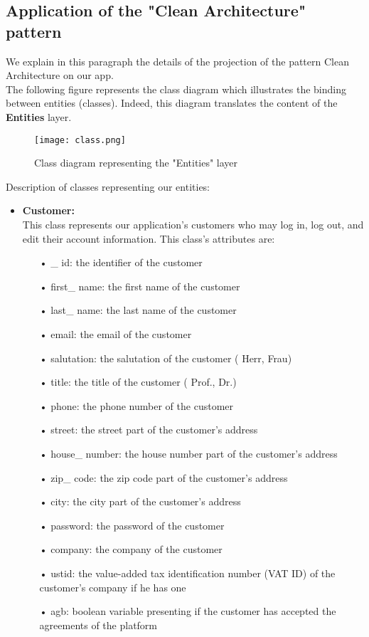 \subsection{Application of the "Clean Architecture" pattern}
We explain in this paragraph the details of the projection of the pattern
Clean Architecture on our app.\\
The following figure represents the class diagram which illustrates the binding
between entities (classes). Indeed, this diagram translates the content of the \textbf{Entities} layer.
\begin{figure}[H]%
    \center   
    \texttt{[image: class.png]}
    \caption{Class diagram representing the "Entities" layer}
\end{figure}
\newpage
Description of classes representing our entities:
\begin{itemize}
\item \textbf{Customer:}\\
This class represents our application's customers who may log in, log out, and edit their account information. This class's attributes are:
\begin{itemize}
\item[•] \_ id: the identifier of the customer
\item[•] first\_ name: the first name of the customer
\item[•] last\_ name: the last name of the customer
\item[•] email: the email of the customer
\item[•] salutation: the salutation of the customer ( Herr, Frau)
\item[•] title: the title of the customer ( Prof., Dr.)
\item[•] phone: the phone number of the customer
\item[•] street: the street part of the customer's address
\item[•] house\_ number: the house number part of the customer's address
\item[•] zip\_ code: the zip code part of the customer's address
\item[•] city: the city part of the customer's address
\item[•] password: the password of the customer
\item[•] company: the company of the customer
\item[•] ustid: the value-added tax identification number (VAT ID) of the customer's company if he has one
\item[•] agb: boolean variable presenting if the customer has accepted the agreements of the platform

\end{itemize}
\end{itemize}
